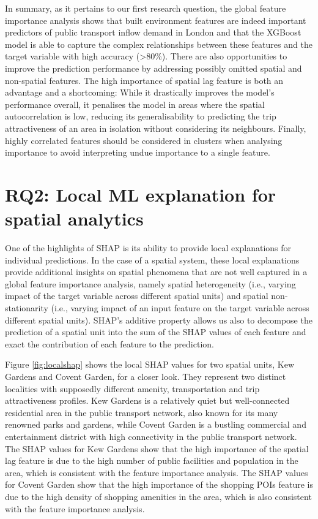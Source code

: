 In summary, as it pertains to our first research question, the global feature importance analysis shows that built environment features are indeed important predictors of public transport inflow demand in London and that the XGBoost model is able to capture the complex relationships between these features and the target variable with high accuracy (>80\%). There are also opportunities to improve the prediction performance by addressing possibly omitted spatial and non-spatial features. The high importance of spatial lag feature is both an advantage and a shortcoming: While it drastically improves the model's performance overall, it penalises the model in areas where the spatial autocorrelation is low, reducing its generalisability to predicting the trip attractiveness of an area in isolation without considering its neighbours. Finally, highly correlated features should be considered in clusters when analysing importance to avoid interpreting undue importance to a single feature.

\section{RQ2: Local ML explanation for spatial analytics}

One of the highlights of SHAP is its ability to provide local explanations for individual predictions. In the case of a spatial system, these local explanations provide additional insights on spatial phenomena that are not well captured in a global feature importance analysis, namely spatial heterogeneity (i.e., varying impact of the target variable across different spatial units) and spatial non-stationarity (i.e., varying impact of an input feature on the target variable across different spatial units). SHAP's additive property allows us also to decompose the prediction of a spatial unit into the sum of the SHAP values of each feature and exact the contribution of each feature to the prediction.

Figure \ref{fig:localshap} shows the local SHAP values for two spatial units, Kew Gardens and Covent Garden, for a closer look. They represent two distinct localities with supposedly different amenity, transportation and trip attractiveness profiles. Kew Gardens is a relatively quiet but well-connected residential area in the public transport network, also known for its many renowned parks and gardens, while Covent Garden is a bustling commercial and entertainment district with high connectivity in the public transport network. The SHAP values for Kew Gardens show that the high importance of the spatial lag feature is due to the high number of public facilities and population in the area, which is consistent with the feature importance analysis. The SHAP values for Covent Garden show that the high importance of the shopping POIs feature is due to the high density of shopping amenities in the area, which is also consistent with the feature importance analysis.

